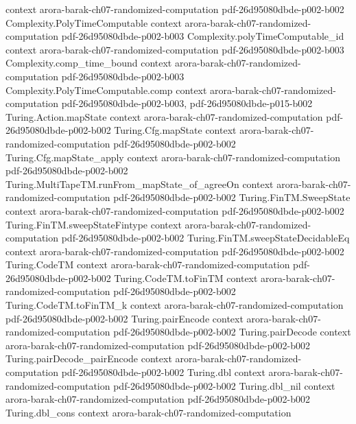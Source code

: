 \begin{theorem}
  {context}
  {arora-barak-ch07-randomized-computation}
  {pdf-26d95080dbde-p002-b002}
\proofstep
  {Complexity.PolyTimeComputable}
  {context}
  {arora-barak-ch07-randomized-computation}
  {pdf-26d95080dbde-p002-b003}
\proofstep
  {Complexity.polyTimeComputable_id}
  {context}
  {arora-barak-ch07-randomized-computation}
  {pdf-26d95080dbde-p002-b003}
\proofstep
  {Complexity.comp_time_bound}
  {context}
  {arora-barak-ch07-randomized-computation}
  {pdf-26d95080dbde-p002-b003}
\proofstep
  {Complexity.PolyTimeComputable.comp}
  {context}
  {arora-barak-ch07-randomized-computation}
  {pdf-26d95080dbde-p002-b003,
    pdf-26d95080dbde-p015-b002}
\proofstep
  {Turing.Action.mapState}
  {context}
  {arora-barak-ch07-randomized-computation}
  {pdf-26d95080dbde-p002-b002}
\proofstep
  {Turing.Cfg.mapState}
  {context}
  {arora-barak-ch07-randomized-computation}
  {pdf-26d95080dbde-p002-b002}
\proofstep
  {Turing.Cfg.mapState_apply}
  {context}
  {arora-barak-ch07-randomized-computation}
  {pdf-26d95080dbde-p002-b002}
\proofstep
  {Turing.MultiTapeTM.runFrom_mapState_of_agreeOn}
  {context}
  {arora-barak-ch07-randomized-computation}
  {pdf-26d95080dbde-p002-b002}
\proofstep
  {Turing.FinTM.SweepState}
  {context}
  {arora-barak-ch07-randomized-computation}
  {pdf-26d95080dbde-p002-b002}
\proofstep
  {Turing.FinTM.sweepStateFintype}
  {context}
  {arora-barak-ch07-randomized-computation}
  {pdf-26d95080dbde-p002-b002}
\proofstep
  {Turing.FinTM.sweepStateDecidableEq}
  {context}
  {arora-barak-ch07-randomized-computation}
  {pdf-26d95080dbde-p002-b002}
\proofstep
  {Turing.CodeTM}
  {context}
  {arora-barak-ch07-randomized-computation}
  {pdf-26d95080dbde-p002-b002}
\proofstep
  {Turing.CodeTM.toFinTM}
  {context}
  {arora-barak-ch07-randomized-computation}
  {pdf-26d95080dbde-p002-b002}
\proofstep
  {Turing.CodeTM.toFinTM_k}
  {context}
  {arora-barak-ch07-randomized-computation}
  {pdf-26d95080dbde-p002-b002}
\proofstep
  {Turing.pairEncode}
  {context}
  {arora-barak-ch07-randomized-computation}
  {pdf-26d95080dbde-p002-b002}
\proofstep
  {Turing.pairDecode}
  {context}
  {arora-barak-ch07-randomized-computation}
  {pdf-26d95080dbde-p002-b002}
\proofstep
  {Turing.pairDecode_pairEncode}
  {context}
  {arora-barak-ch07-randomized-computation}
  {pdf-26d95080dbde-p002-b002}
\proofstep
  {Turing.dbl}
  {context}
  {arora-barak-ch07-randomized-computation}
  {pdf-26d95080dbde-p002-b002}
\proofstep
  {Turing.dbl_nil}
  {context}
  {arora-barak-ch07-randomized-computation}
  {pdf-26d95080dbde-p002-b002}
\proofstep
  {Turing.dbl_cons}
  {context}
  {arora-barak-ch07-randomized-computation}

\end{theorem}
